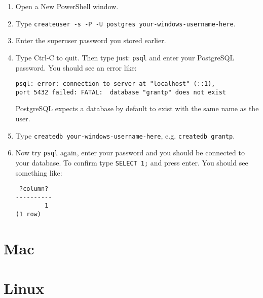 \begin{enumerate}

\item
	Open a New PowerShell window.

\item
	Type \texttt{createuser -s -P -U postgres your-windows-username-here}.
	
\item
	Enter the superuser password you stored earlier.

\item
	Type Ctrl-C to quit.
	Then type just:
	\texttt{psql}
	and enter your PostgreSQL password.
	You should see an error like:
\begin{verbatim}
psql: error: connection to server at "localhost" (::1),
port 5432 failed: FATAL:  database "grantp" does not exist
\end{verbatim}
	PostgreSQL expects a database by default to exist with the same name as the user.

\item
	Type \texttt{createdb your-windows-username-here}, e.g.
	\texttt{createdb grantp}.
	
\item 
	Now try \texttt{psql} again, enter your password and you should be connected to your database.
	To confirm type \texttt{SELECT 1;} and press enter.
	You should see something like:
\begin{verbatim}
 ?column?
----------
        1
(1 row)
\end{verbatim}

\end{enumerate}


\section{Mac}
\label{sec:postgresql-setup-mac}

\section{Linux}
\label{sec:postgresql-setup-linux}

